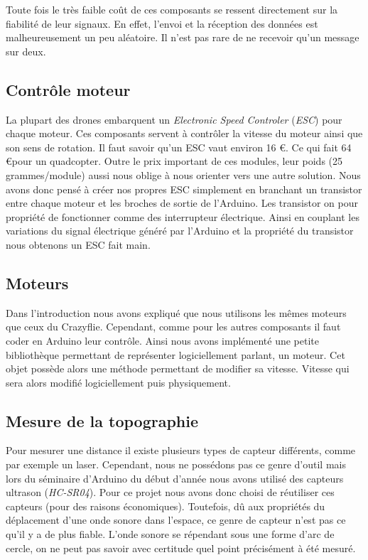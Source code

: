 \documentclass[a4paper,10pt]{report}
\begin{document}
	Toute fois le très faible coût de ces composants se ressent directement 
sur la fiabilité de leur signaux. En effet, l'envoi et la réception des données 
est malheureusement un peu aléatoire. Il n'est pas rare de ne recevoir qu'un 
message sur deux.
	
      
      \subsection{Contrôle moteur}
	La plupart des drones embarquent un \textit{Electronic Speed Controler} 
(\textit{ESC}) pour chaque moteur. Ces composants servent à contrôler la 
vitesse du moteur ainsi que son sens de rotation. Il faut savoir qu'un ESC vaut 
environ 16 \euro. Ce qui fait 64 \euro \space pour un quadcopter. Outre le prix 
important de ces modules, leur poids (25 grammes/module) aussi nous oblige à 
nous orienter vers une autre solution. Nous avons donc pensé à créer nos 
propres 
ESC simplement en branchant un transistor entre chaque moteur et les broches de 
sortie de l’Arduino. Les transistor on pour propriété de fonctionner comme des 
interrupteur électrique. Ainsi en couplant les variations du signal électrique 
généré par l'Arduino et la propriété du transistor nous obtenons un ESC fait 
main.

      \subsection{Moteurs}
	Dans l'introduction nous avons expliqué que nous utilisons les mêmes 
moteurs que ceux du Crazyflie. Cependant, comme pour les autres composants il 
faut coder en Arduino leur contrôle. Ainsi nous avons implémenté une petite 
bibliothèque permettant de représenter logiciellement parlant, un moteur. Cet 
objet possède alors une méthode permettant de modifier sa vitesse. Vitesse qui 
sera alors modifié logiciellement puis physiquement.

      \subsection{Mesure de la topographie}
	Pour mesurer une distance il existe plusieurs types de capteur 
différents, comme par exemple un laser. Cependant, nous ne possédons pas ce 
genre d'outil mais lors du séminaire d'Arduino du début d'année nous avons 
utilisé des capteurs ultrason (\textit{HC-SR04}). Pour ce projet nous avons 
donc choisi de réutiliser ces capteurs (pour des raisons économiques). 
Toutefois, dû aux propriétés du déplacement d'une onde sonore dans l'espace, ce 
genre de capteur n'est pas ce qu'il y a de plus fiable. L'onde sonore se 
répendant sous une forme d'arc de cercle, on ne peut pas savoir avec certitude 
quel point précisément à été mesuré.
\end{document}
